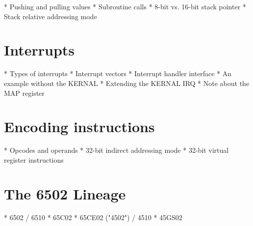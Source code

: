 * Pushing and pulling values
* Subroutine calls
* 8-bit vs. 16-bit stack pointer
* Stack relative addressing mode

\section{Interrupts}

* Types of interrupts
* Interrupt vectors
* Interrupt handler interface
* An example without the KERNAL
* Extending the KERNAL IRQ
* Note about the MAP register

\section{Encoding instructions}

* Opcodes and operands
* 32-bit indirect addressing mode
* 32-bit virtual register instructions

\section{The 6502 Lineage}

* 6502 / 6510
* 65C02
* 65CE02 ("4502") / 4510
* 45GS02
